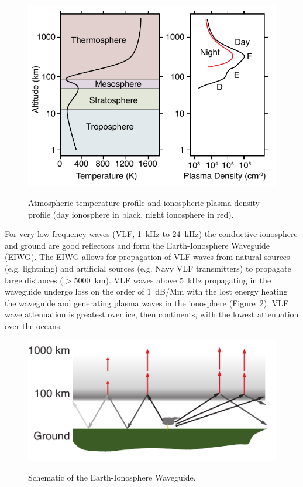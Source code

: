 \begin{figure}[ht!]
	\centering
	\includegraphics[scale=1]{Introduction/Figures/ionosphere.pdf}\\
	\caption{Atmospheric temperature profile and ionospheric plasma density profile (day ionosphere in black, night ionosphere in red).
		     }
	\label{intro:fig:ionosphere}
\end{figure}

For very low frequency waves (VLF, 1~kHz to 24~kHz) the conductive ionosphere and ground are good reflectors and form the Earth-Ionosphere Waveguide (EIWG).
The EIWG allows for propagation of VLF waves from natural sources (e.g. lightning) and artificial sources (e.g. Navy VLF transmitters) to propagate large distances ($>5000$~km).
VLF waves above 5~kHz propagating in the waveguide undergo loss on the order of 1~dB/Mm with the lost energy heating the waveguide and generating plasma waves in the ionosphere (Figure~\ref{intro:fig:eiwg}).
VLF wave attenuation is greatest over ice, then continents, with the lowest attenuation over the oceans.

\begin{figure}[ht!]
	\centering
	\includegraphics[scale=1]{Introduction/Figures/eiwg.pdf}\\
	\caption{Schematic of the Earth-Ionosphere Waveguide.}
	\label{intro:fig:eiwg}
\end{figure}


